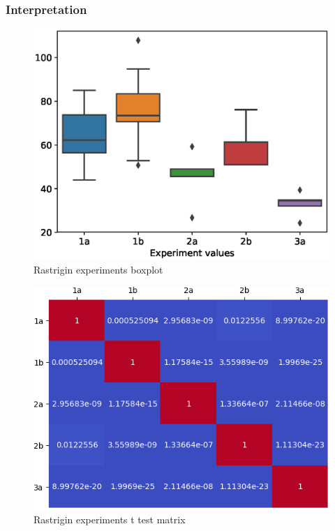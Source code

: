 \documentclass{article}
\begin{document}
\subsubsection{Interpretation}
\begin{figure}[!htbp]
	\centering
	\begin{minipage}{\textwidth}
		\centering
		\includegraphics[scale=.8]{boxplots/rastrigin_boxplot.eps}
		\caption{Rastrigin experiments boxplot}
		\label{fig:rastrigin_experiments_boxplot}
	\end{minipage}\hfill
\end{figure}
\FloatBarrier

\begin{figure}[!htbp]
	\centering
	\begin{minipage}{\textwidth}
		\centering
		\includegraphics[scale=.8]{t_test/rastrigin_t_test_matrix.png}
		\caption{Rastrigin experiments t test matrix}
		\label{fig:rastrigin_experiments_t_test}
	\end{minipage}\hfill
\end{figure}
\FloatBarrier
\end{document}
